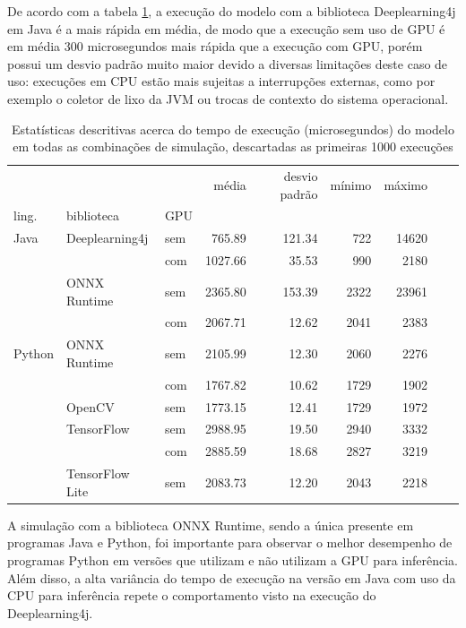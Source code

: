 De acordo com a tabela \ref{tab:all}, a execução do modelo com a biblioteca Deeplearning4j em Java é a mais rápida em média, de modo que a execução sem uso de GPU é em média 300 microsegundos mais rápida que a execução com GPU, porém possui um desvio padrão muito maior devido a diversas limitações deste caso de uso: execuções em CPU estão mais sujeitas a interrupções externas, como por exemplo o coletor de lixo da JVM ou trocas de contexto do sistema operacional.

\begin{table}
  \centering
  \begin{tabular}{lllrrrrrr}
    \toprule
           &                 &     & média   & desvio padrão & mínimo & máximo \\
    ling.  & biblioteca      & GPU &         &               &        &        \\
    \midrule
    Java   & Deeplearning4j  & sem & 765.89  & 121.34        & 722    & 14620  \\
           &                 & com & 1027.66 & 35.53         & 990    & 2180   \\
           & ONNX Runtime    & sem & 2365.80 & 153.39        & 2322   & 23961  \\
           &                 & com & 2067.71 & 12.62         & 2041   & 2383   \\
    Python & ONNX Runtime    & sem & 2105.99 & 12.30         & 2060   & 2276   \\
           &                 & com & 1767.82 & 10.62         & 1729   & 1902   \\
           & OpenCV          & sem & 1773.15 & 12.41         & 1729   & 1972   \\
           & TensorFlow      & sem & 2988.95 & 19.50         & 2940   & 3332   \\
           &                 & com & 2885.59 & 18.68         & 2827   & 3219   \\
           & TensorFlow Lite & sem & 2083.73 & 12.20         & 2043   & 2218   \\
    \bottomrule
  \end{tabular}
  \caption{Estatísticas descritivas acerca do tempo de execução (microsegundos) do modelo em todas as combinações de simulação, descartadas as primeiras 1000 execuções}
  \label{tab:all}
\end{table}

A simulação com a biblioteca ONNX Runtime, sendo a única presente em programas Java e Python, foi importante para observar o melhor desempenho de programas Python em versões que utilizam e não utilizam a GPU para inferência. Além disso, a alta variância do tempo de execução na versão em Java com uso da CPU para inferência repete o comportamento visto na execução do Deeplearning4j.

